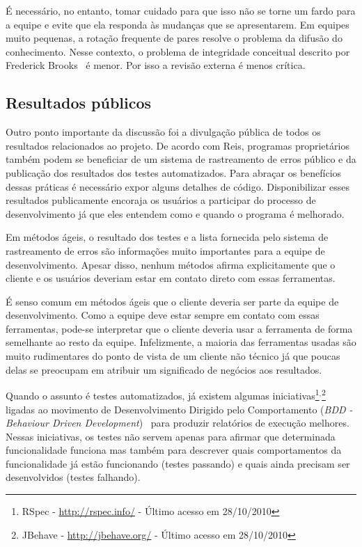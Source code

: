 É necessário, no entanto, tomar cuidado para que isso não se torne um
fardo para a equipe e evite que ela responda às mudanças que se
apresentarem. Em equipes muito pequenas, a rotação frequente de pares
resolve o problema da difusão do conhecimento. Nesse contexto, o
problema de integridade conceitual descrito por Frederick
Brooks~\cite{Brooks1975-mmme} é menor. Por isso a revisão externa é
menos crítica.

\subsection{Resultados públicos}
\label{subsec:publicity}

Outro ponto importante da discussão foi a divulgação pública de todos
os resultados relacionados ao projeto. De acordo com Reis, programas
proprietários também podem se beneficiar de um sistema de rastreamento
de erros público e da publicação dos resultados dos testes
automatizados. Para abraçar os benefícios dessas práticas é necessário
expor alguns detalhes de código. Disponibilizar esses resultados
publicamente encoraja os usuários a participar do processo de
desenvolvimento já que eles entendem como e quando o programa é
melhorado.

Em métodos ágeis, o resultado dos testes e a lista fornecida pelo
sistema de rastreamento de erros são informações muito importantes
para a equipe de desenvolvimento. Apesar disso, nenhum métodos afirma
explicitamente que o cliente e os usuários deveriam estar em contato
direto com essas ferramentas.

É senso comum em métodos ágeis que o cliente deveria ser parte da
equipe de desenvolvimento. Como a equipe deve estar sempre em contato
com essas ferramentas, pode-se interpretar que o cliente deveria usar
a ferramenta de forma semelhante ao resto da equipe. Infelizmente, a
maioria das ferramentas usadas são muito rudimentares do ponto de
vista de um cliente não técnico já que poucas delas se preocupam em
atribuir um significado de negócios aos resultados.

Quando o assunto é testes automatizados, já existem algumas
iniciativas\footnote{RSpec - \url{http://rspec.info/} - Último acesso
  em 28/10/2010}$^{, }$\footnote{JBehave - \url{http://jbehave.org/} -
  Último acesso em 28/10/2010} ligadas ao movimento de Desenvolvimento
Dirigido pelo Comportamento (\emph{BDD - Behaviour Driven
  Development})~\cite{North2006} para produzir relatórios de execução
melhores. Nessas iniciativas, os testes não servem apenas para afirmar
que determinada funcionalidade funciona mas também para descrever
quais comportamentos da funcionalidade já estão funcionando (testes
passando) e quais ainda precisam ser desenvolvidos (testes falhando).

